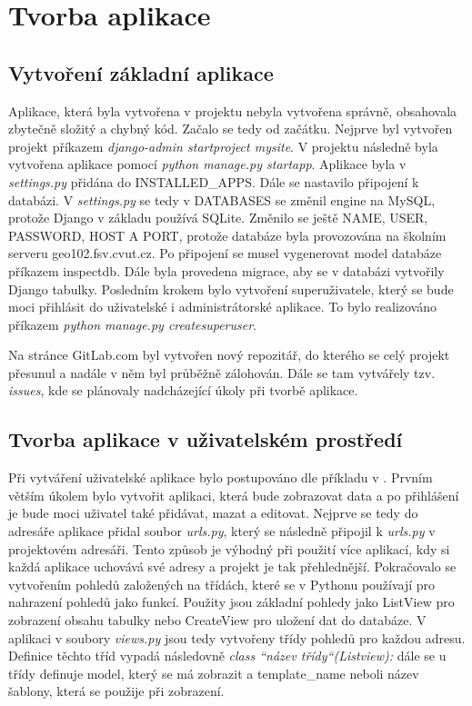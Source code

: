 \chapter{Tvorba aplikace}
\label{4-tvorba-aplikace}

\section{Vytvoření základní aplikace}

Aplikace, která byla vytvořena v projektu  nebyla vytvořena
správně, obsahovala zbytečně složitý a chybný kód. Začalo se tedy
od začátku. Nejprve byl vytvořen projekt příkazem \emph{django-admin
  startproject mysite}. V projektu následně byla vytvořena aplikace
pomocí \emph{python manage.py startapp}. Aplikace byla v
\emph{settings.py} přidána do INSTALLED\_APPS. Dále se
nastavilo připojení k databázi. V \emph{settings.py} se tedy v
DATABASES se změnil engine na MySQL, protože Django v základu
používá SQLite. Změnilo se ještě NAME, USER, PASSWORD, HOST A PORT,
protože databáze byla provozována na školním serveru
geo102.fsv.cvut.cz. Po připojení se musel vygenerovat model databáze
příkazem inspectdb. Dále byla
provedena migrace, aby se v databázi vytvořily Django
tabulky. Posledním krokem bylo vytvoření superuživatele, který se bude
moci přihlásit do uživatelské i administrátorské aplikace. To bylo
realizováno příkazem \emph{python manage.py createsuperuser}.

Na stránce GitLab.com byl vytvořen nový repozitář, do kterého se celý
projekt přesunul a nadále v něm byl průběžně zálohován. Dále se tam
vytvářely tzv. \emph{issues}, kde se plánovaly nadcházející úkoly při
tvorbě aplikace.

\section{Tvorba aplikace v uživatelském prostředí}
Při vytváření uživatelské aplikace bylo postupováno dle příkladu v \cite{django-for-beginners}.
Prvním větším úkolem bylo vytvořit aplikaci, která bude zobrazovat
data a po přihlášení je bude moci uživatel také přidávat, mazat a
editovat. Nejprve se tedy do adresáře aplikace přidal soubor \emph{urls.py},
který se následně připojil k \emph{urls.py} v projektovém adresáři. Tento
způsob je výhodný při použití více aplikací, kdy si každá aplikace
uchovává své  adresy a projekt je tak přehlednější. Pokračovalo se
vytvořením pohledů založených na třídách, které se v Pythonu používají
pro nahrazení pohledů jako funkcí. Použity jsou základní pohledy jako
ListView pro zobrazení obsahu tabulky nebo CreateView pro uložení dat
do databáze. V aplikaci v soubory \emph{views.py} jsou tedy vytvořeny
třídy pohledů pro každou  adresu. Definice těchto tříd vypadá
následovně \emph{class “název třídy“(Listview):} dále se u třídy
definuje model, který se má zobrazit a template\_name neboli název
šablony, která se použije při zobrazení.


